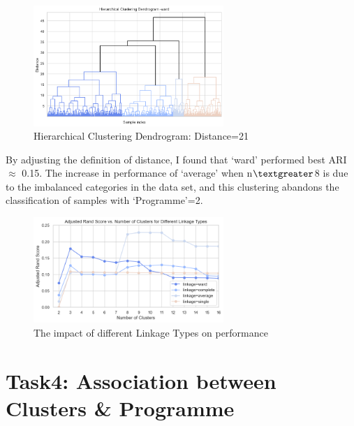 \documentclass[journal]{IEEEtai}
\begin{document}
\begin{figure}[htbp]
	\centerline{\includegraphics[width=17pc]{Hierarchical Clustering Dendrogram -ward.png}}
	\caption{Hierarchical Clustering Dendrogram: Distance=21}
\end{figure}

By adjusting the definition of distance, I found that `ward' performed best ARI$\approx$ 0.15. The increase in performance of `average' when n$\textgreater$8 is due to the imbalanced categories in the data set, and this clustering abandons the classification of samples with `Programme'=2.

\begin{figure}[htbp]
	\centerline{\includegraphics[width=17pc]{Different Linkage Types.png}}
	\caption{The impact of different Linkage Types on performance}
\end{figure}

\section{\textbf{Task4: Association between Clusters \& Programme}}
\end{document}
